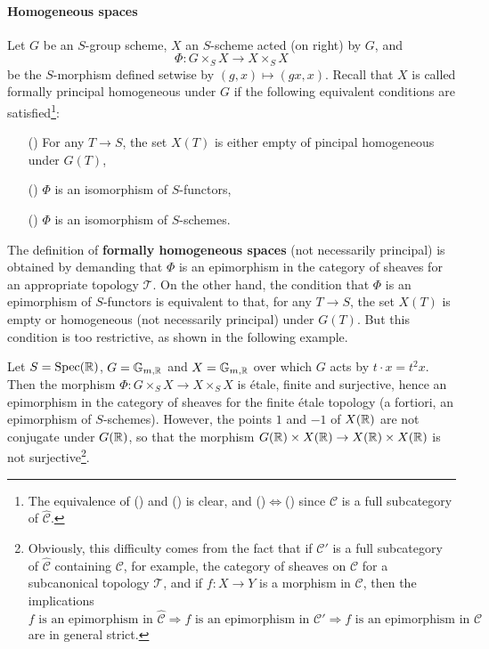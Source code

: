 \paragraph{Homogeneous spaces}
Let $G$ be an $S$-group scheme, $X$ an $S$-scheme acted (on right) by $G$, and
\[\Phi:G\times_SX\to X\times_SX\]
be the $S$-morphism defined setwise by $(g,x)\mapsto(gx,x)$. Recall that $X$ is called formally principal homogeneous under $G$ if the following equivalent conditions are satisfied\footnote{The equivalence of () and () is clear, and ()$\Leftrightarrow$() since $\mathcal{C}$ is a full subcategory of $\widehat{\mathcal{C}}$.}:
\begin{enumerate}
    \item[(\rmnum{1})] For any $T\to S$, the set $X(T)$ is either empty of pincipal homogeneous under $G(T)$,
    \item[(\rmnum{2})] $\Phi$ is an isomorphism of $S$-functors,
    \item[(\rmnum{3})] $\Phi$ is an isomorphism of $S$-schemes.  
\end{enumerate}
The definition of \textbf{formally homogeneous spaces} (not necessarily principal) is obtained by demanding that $\Phi$ is an epimorphism in the category of sheaves for an appropriate topology $\mathcal{T}$. On the other hand, the condition that $\Phi$ is an epimorphism of $S$-functors is equivalent to that, for any $T\to S$, the set $X(T)$ is empty or homogeneous (not necessarily principal) under $G(T)$. But this condition is too restrictive, as shown in the following example.

\begin{example}
Let $S=\mathrm{Spec}(\mathbb{R})$, $G=\mathbb{G}_{m,\mathbb{R}}$ and $X=\mathbb{G}_{m,\mathbb{R}}$ over which $G$ acts by $t\cdot x=t^2x$. Then the morphism $\Phi:G\times_SX\to X\times_SX$ is \'etale, finite and surjective, hence an epimorphism in the category of sheaves for the finite \'etale topology (a fortiori, an epimorphism of $S$-schemes). However, the points $1$ and $-1$ of $X(\mathbb{R})$ are not conjugate under $G(\mathbb{R})$, so that the morphism $G(\mathbb{R})\times X(\mathbb{R})\to X(\mathbb{R})\times X(\mathbb{R})$ is not surjective\footnote{Obviously, this difficulty comes from the fact that if $\mathcal{C}'$ is a full subcategory of $\widehat{\mathcal{C}}$ containing $\mathcal{C}$, for example, the category of sheaves on $\mathcal{C}$ for a subcanonical topology $\mathcal{T}$, and if $f:X\to Y$ is a morphism in $\mathcal{C}$, then the implications
\[\text{$f$ is an epimorphism in $\widehat{\mathcal{C}}$}\Rightarrow\text{$f$ is an epimorphism in $\mathcal{C}'$}\Rightarrow\text{$f$ is an epimorphism in $\mathcal{C}$}\]
are in general strict.
}.
\end{example}

